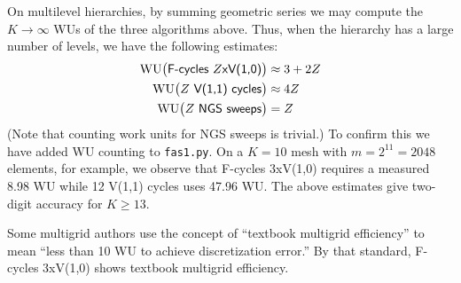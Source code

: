 \documentclass[letterpaper,final,12pt,reqno]{amsart}
\begin{document}
On multilevel hierarchies, by summing geometric series \cite{Briggsetal2000} we may compute the $K\to\infty$ WUs of the three algorithms above.  Thus, when the hierarchy has a large number of levels, we have the following estimates:
\begin{align*}
\text{WU}\big(\text{\textsf{F-cycles $Z$xV(1,0)}}\big) &\approx 3+2Z \\
\text{WU}\big(\text{\textsf{$Z$ V(1,1) cycles}}\big)   &\approx 4Z \\
\text{WU}\big(\text{\textsf{$Z$ NGS sweeps}}\big)      &= Z
\end{align*}
(Note that counting work units for NGS sweeps is trivial.)  To confirm this we have added WU counting to \texttt{fas1.py}.  On a $K=10$ mesh with $m=2^{11}=2048$ elements, for example, we observe that \textsf{F-cycles 3xV(1,0)} requires a measured 8.98 WU while \textsf{12 V(1,1) cycles} uses 47.96 WU.  The above estimates give two-digit accuracy for $K \ge 13$.

Some multigrid authors \cite[for example]{BrownSmithAhmadia2013} use the concept of ``textbook multigrid efficiency'' to mean ``less than 10 WU to achieve discretization error.''  By that standard, \textsf{F-cycles 3xV(1,0)} shows textbook multigrid efficiency.
\end{document}

